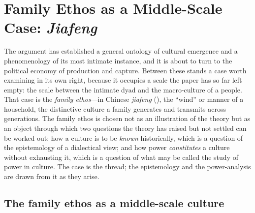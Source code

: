 \section{Family Ethos as a Middle-Scale Case: \emph{Jiafeng}}
\label{p24:sec:familyethos}

\noindent
The argument has established a general ontology of cultural emergence and a phenomenology of its most intimate instance, and it is about to turn to the political economy of production and capture. Between these stands a case worth examining in its own right, because it occupies a scale the paper has so far left empty: the scale between the intimate dyad and the macro-culture of a people. That case is the \emph{family ethos}---in Chinese \emph{jiafeng} (), the ``wind'' or manner of a household, the distinctive culture a family generates and transmits across generations. The family ethos is chosen not as an illustration of the theory but as an object through which two questions the theory has raised but not settled can be worked out: how a culture is to be \emph{known} historically, which is a question of the epistemology of a dialectical view; and how power \emph{constitutes} a culture without exhausting it, which is a question of what may be called the study of power in culture. The case is the thread; the epistemology and the power-analysis are drawn from it as they arise.

\subsection*{The family ethos as a middle-scale culture}

